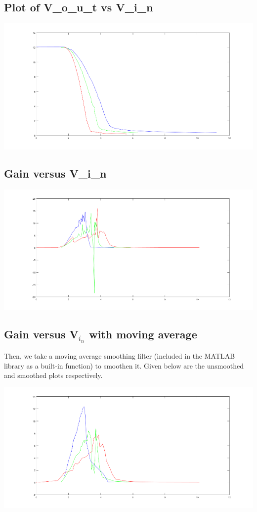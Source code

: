 \documentclass[12pt]{article}
\begin{document}
\subsection*{Plot of V_o_u_t vs V_i_n}
\begin{center}
    \includegraphics{data.png}
\end{center}

\subsection*{Gain versus V_i_n }
\begin{center}
    \includegraphics{gain_correct.png}
\end{center}

\subsection*{Gain versus V$_i_n$ with moving average }
Then, we take a moving average smoothing filter (included in the MATLAB library as a built-in function) to smoothen it. Given below are the unsmoothed and smoothed plots respectively.
\begin{center}
    \includegraphics{gain_moving_avg.png}
\end{center}
\end{document}
